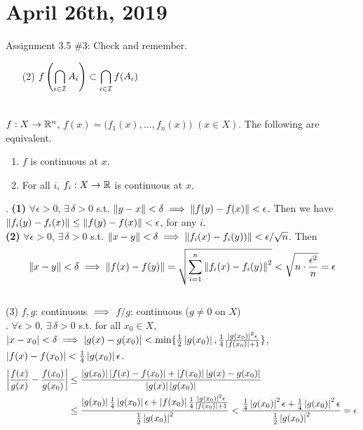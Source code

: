 \section*{April 26th, 2019}
Assignment 3.5 \#3: Check and remember.
\begin{enumerate}
	\item[(2)] $\displaystyle f\left(\bigcap_{i\in \mathcal{I}}A_i\right) \subset \bigcap_{i\in \mathcal{I}}f(A_i)$
\end{enumerate}~\\
 $f:X\rightarrow \mathbb{R}^n$, $f(x) = \big(f_1(x), \dots, f_n(x)\big)$ $(x\in X)$. The following are equivalent.
\begin{enumerate}
	\item $f$ is continuous at $x$.
	\item For all $i$, $f_i: X\rightarrow \mathbb{R}$ is continuous at $x$.
\end{enumerate}
\pf. \textbf{(1)} $\forall \epsilon >0$, $\exists\,\delta > 0$ s.t. $\left\lVert y-x\right\rVert < \delta \implies \left\lVert f(y)-f(x)\right\rVert < \epsilon$. Then we have $\left\lVert f_i(y)-f_i(x)\right\rVert \leq \left\lVert f(y) -f(x)\right\rVert < \epsilon$, for any $i$.\\
\textbf{(2)} $\forall \epsilon > 0$, $\exists\,\delta > 0$ s.t. $\left\lVert x - y\right\rVert < \delta \implies \left\lVert f_i(x) - f_i(y))\right\rVert < \epsilon /\sqrt{n}$. Then $$\left\lVert x - y\right\rVert < \delta \implies \left\lVert f(x) - f(y)\right\rVert  = \sqrt{\sum_{i = 1}^n\left\lVert f_i(x) - f_i(y)\right\rVert^2} < \sqrt{n\cdot \frac{\epsilon^2}{n}} = \epsilon$$
\\
 (3) $f, g$: continuous $\implies$ $f/g$: continuous ($g \neq 0$ on $X$)\\
\pf. $\forall \epsilon > 0$, $\exists\,\delta > 0$ s.t. for all $x_0\in X$,\\
$\left|x - x_0\right| < \delta \implies \left|g(x)-g(x_0)\right| < \min\{ \frac{1}{2}\left|g(x_0)\right|, \frac{1}{4}\frac{\left|g(x_0)\right|^2\epsilon}{\left|f(x_0)\right|+1} \}$, $\left|f(x)-f(x_0)\right| < \frac{1}{4} \left|g(x_0)\right|\epsilon$.
$$\begin{aligned}
	\left|\frac{f(x)}{g(x)} - \frac{f(x_0)}{g(x_0)}\right| &\leq \frac{\left|g(x_0)\right|\left|f(x)-f(x_0)\right| + \left|f(x_0)\right|\left|g(x)-g(x_0)\right|}{\left|g(x)\right|\left|g(x_0)\right|}\\
	&\leq \frac{\left|g(x_0)\right|\frac{1}{4}\left|g(x_0)\right|\epsilon + \left|f(x_0)\right|\frac{1}{4}\frac{\left|g(x_0)\right|^2\epsilon}{\left|f(x_0)\right| + 1}}{\frac{1}{2}\left|g(x_0)\right|^2} < \frac{\frac{1}{4}\left|g(x_0)\right|^2\epsilon+\frac{1}{4}\left|g(x_0)\right|^2\epsilon}{\frac{1}{2}\left|g(x_0)\right|^2}=\epsilon
\end{aligned}$$
\\
\\

